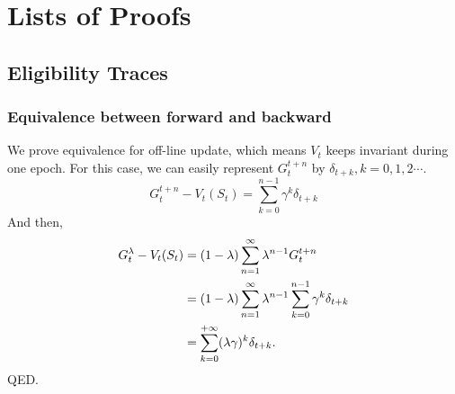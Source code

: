 \documentclass[11pt,a4paper]{article}
\begin{document}
\clearpage




\appendix
\section{Lists of Proofs}
\subsection{Eligibility Traces}
\subsubsection{Equivalence between forward and backward}
We prove equivalence for off-line update, which means $V_t$ keeps invariant during one epoch. For this case, we can easily represent $G_{t}^{t+n}$ by $\delta_{t+k}, k=0,1,2\cdots$.
\begin{equation}
    G_{t}^{t+n} - V_t(S_t) = \sum_{k=0}^{n-1}\gamma^k \delta_{t+k}
\end{equation} 
And then,
\begin{equation}
    \aligned 
    G_{t}^{\lambda} - V_t(S_t) & = (1-\lambda)\sum_{n=1}^{\infty}\lambda^{n-1}G_{t}^{t+n}  \\ & = (1-\lambda)\sum_{n=1}^{\infty}\lambda^{n-1}\sum_{k=0}^{n-1}\gamma^k\delta_{t+k} \\ & = \sum_{k=0}^{+\infty} (\lambda\gamma)^k\delta_{t+k}.  
    \endaligned
\end{equation}
QED. \\ 
\end{document}
